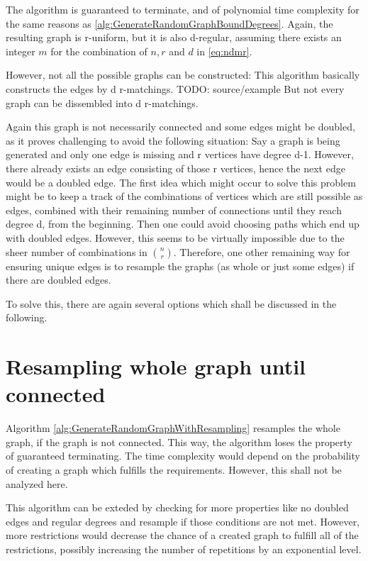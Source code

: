 The algorithm is guaranteed to terminate, and of polynomial time complexity for the same reasons as \cref{alg:GenerateRandomGraphBoundDegrees}.
Again, the resulting graph is r-uniform, but it is also d-regular, assuming there exists an integer $m$ for the combination of $n, r$ and $d$ in \cref{eq:ndmr}.

However, not all the possible graphs can be constructed: This algorithm basically constructs the edges by d r-matchings. TODO: source/example But not every graph can be dissembled into d r-matchings.

Again this graph is not necessarily connected and some edges might be doubled, as it proves challenging to avoid the following situation: Say a graph is being generated and only one edge is missing and r vertices have degree d-1. However, there already exists an edge consisting of those r vertices, hence the next edge would be a doubled edge. The first idea which might occur to solve this problem might be to keep a track of the combinations of vertices which are still possible as edges, combined with their remaining number of connections until they reach degree d, from the beginning. Then one could avoid choosing paths which end up with doubled edges. However, this seems to be virtually impossible due to the sheer number of combinations in $n\choose r$. Therefore, one other remaining way for ensuring unique edges is to resample the graphs (as whole or just some edges) if there are doubled edges.


To solve this, there are again several options which shall be discussed in the following.
\section{Resampling whole graph until connected}
Algorithm \ref{alg:GenerateRandomGraphWithResampling} resamples the whole graph, if the graph is not connected. This way, the algorithm loses the property of guaranteed terminating. The time complexity would depend on the probability of creating a graph which fulfills the requirements. However, this shall not be analyzed here. 


This algorithm can be exteded by checking for more properties like no doubled edges and regular degrees and resample if those conditions are not met. However, more restrictions would decrease the chance of a created graph to fulfill all of the restrictions, possibly increasing the number of repetitions by an exponential level.



